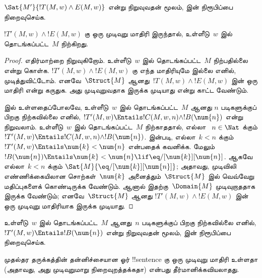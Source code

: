 \documentclass[../../../include/open-logic-section]{subfiles}
\begin{document}
\begin{prob}
  $\Sat{M'}{!T(M,w) \land E(M,w)}$ என்று நிறுவுவதன் மூலம்,
   இன் நிரூபிப்பை நிறைவுசெய்க.
\end{prob}

\begin{lem}
  $!T'(M,w) \land !E(M,w)$ கு ஒரு முடிவுறு மாதிரி இருந்தால்,
  உள்ளீடு~$w$ இல் தொடங்கப்பட்ட~$M$ நிற்கிறது.
\end{lem}

\begin{proof}
  எதிர்மாற்றை நிறுவுகிறோம். உள்ளீடு~$w$ இல் தொடங்கப்பட்ட~$M$
  நிற்பதில்லை என்று கொள்க. $!T'(M,w) \land !E(M,w)$ கு எந்த
  மாதிரியுமே இல்லை எனில், முடித்துவிட்டோம். எனவே~$\Struct{M}$
  ஆனது~$!T(M,w) \land !E(M, w)$ இன் ஒரு மாதிரி என்று கருதுக.
  அது முடிவுறுவதாக இருக்க முடியாது என்று காட்ட வேண்டும்.
  
   இல் உள்ளதைப்போலவே, உள்ளீடு~$w$ இல்
  தொடங்கப்பட்ட~$M$ ஆனது $n$ படிகளுக்குப் பிறகு நிற்கவில்லை எனில்,
  $!T'(M,w) \Entails !C(M, w, n) \land !B(\num{n})$ என்று நிறுவலாம்.
  உள்ளீடு~$w$ இல் தொடங்கப்பட்ட~$M$ நிற்காததால், எல்லா
  ~$n \in \Nat$ க்கும்
  $!T'(M,w) \Entails !C(M, w, n) \land !B(\num{n})$.
   இன்படி, எல்லா~$k < n$ க்கும்
  $!T'(M,w) \Entails \num{k} < \num{n}$ என்பதைக் கவனிக்க.
  மேலும் $!B(\num{n}) \Entails \num{k} < \num{n} \lif
  \eq/[\num{k}][\num{n}]$. ஆகவே எல்லா~$k < n$ க்கும்
  $\Sat{M}{\eq/[\num{k}][\num{n}]}$; அதாவது, முடிவிலி எண்ணிக்கையிலான
  சொற்கள்~$\num{k}$ அனைத்தும்~$\Struct{M}$ இல் வெவ்வேறு மதிப்புகளைக்
  கொண்டிருக்க வேண்டும். ஆனால் இதற்கு~$\Domain{M}$ முடிவுறாததாக
  இருக்க வேண்டும்; எனவே~$\Struct{M}$ ஆனது
  $!T'(M,w) \land !E(M, w)$ இன் ஒரு முடிவுறு மாதிரியாக இருக்க முடியாது.
\end{proof}

\begin{prob}
  உள்ளீடு~$w$ இல் தொடங்கப்பட்ட~$M$ ஆனது~$n$ படிகளுக்குப் பிறகு
  நிற்கவில்லை எனில், $!T'(M,w) \Entails !B(\num{n})$ என்று
  நிறுவுவதன் மூலம்,
   இன் நிரூபிப்பை நிறைவுசெய்க.
\end{prob}

\begin{thm}[ட்ராக்டென்ப்ரோட்டின் தேற்றம்]
  முதல்தர தருக்கத்தின் தன்னிச்சையான ஓர் !!{sentence} கு ஒரு
  முடிவுறு மாதிரி உள்ளதா (அதாவது, அது முடிவுறுமாறு நிறைவுறத்தக்கதா)
  என்பது தீர்மானிக்கவியலாதது.
\end{thm}
\end{document}
